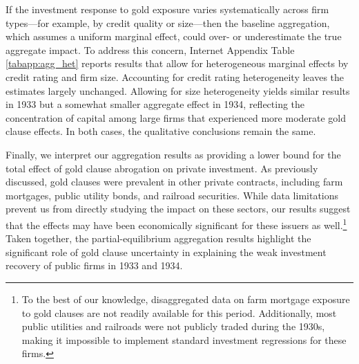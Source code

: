 If the investment response to gold exposure varies systematically across firm types---for example, by credit quality or size---then the baseline aggregation, which assumes a uniform marginal effect, could over- or underestimate the true aggregate impact. To address this concern, Internet Appendix Table \ref{tabapp:agg_het} reports results that allow for heterogeneous marginal effects by credit rating and firm size. Accounting for credit rating heterogeneity leaves the estimates largely unchanged. Allowing for size heterogeneity yields similar results in 1933 but a somewhat smaller aggregate effect in 1934, reflecting the concentration of capital among large firms that experienced more moderate gold clause effects. In both cases, the qualitative conclusions remain the same.

Finally, we interpret our aggregation results as providing a lower bound for the total effect of gold clause abrogation on private investment. As previously discussed, gold clauses were prevalent in other private contracts, including farm mortgages, public utility bonds, and railroad securities. While data limitations prevent us from directly studying the impact on these sectors, our results suggest that the effects may have been economically significant for these issuers as well.\footnote{To the best of our knowledge, disaggregated data on farm mortgage exposure to gold clauses are not readily available for this period. Additionally, most public utilities and railroads were not publicly traded during the 1930s, making it impossible to implement standard investment regressions for these firms.} Taken together, the partial-equilibrium aggregation results highlight the significant role of gold clause uncertainty in explaining the weak investment recovery of public firms in 1933 and 1934.
